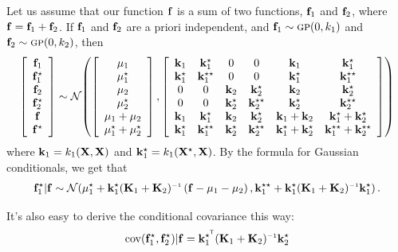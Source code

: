 \documentclass[twoside]{article}
\theoremstyle{definition}
\theoremstyle{remark}
\numberwithin{equation}{section}
\numberwithin{thm}{section}
\begin{document}
Let us assume that our function ${\bf{f}}$ is a sum of two functions, ${\bf{f}}_1$ and ${\bf{f}}_2$, where ${\bf{f}} = {\bf{f}}_1 + {\bf{f}}_2$.  If ${\bf{f}}_1$ and ${\bf{f}}_2$ are a priori independent, and ${\bf{f}}_1 \sim {\textsc{gp}}( 0, k_1)$ and ${\bf{f}}_2 \sim {\textsc{gp}}( 0, k_2)$, then
\begin{align*}
\left[ \begin{array}{c} {\bf{f}}_1 \\ {\bf{f}}_1^\star \\ {\bf{f}}_2 \\ {\bf{f}}_2^\star \\ {\bf{f}} \\ {\bf{f}}^\star \end{array} \right]
\sim
\mathcal{N}\!\left(\left[ \begin{array}{c} {\bf{\mu}}_1 \\ {\bf{\mu}}_1^\star \\ {\bf{\mu}}_2 \\ {\bf{\mu}}_2^\star \\ {\bf{\mu}}_1 + {\bf{\mu}}_2 \\ {\bf{\mu}}_1^\star + {\bf{\mu}}_2^\star \end{array} \right]
,\left[ \begin{array}{cccccc} 
{\bf{k}}_1 & {\bf{k}}_1^\star & 0 & 0 & {\bf{k}}_1 & {\bf{k}}_1^\star \\ 
{\bf{k}}_1^\star & {\bf{k}}_1^{\star\star} & 0 & 0 & {\bf{k}}_1^\star & {\bf{k}}_1^{\star\star} \\
0 & 0 & {\bf{k}}_2 & {\bf{k}}_2^\star & {\bf{k}}_2 & {\bf{k}}_2^\star \\ 
0 & 0 & {\bf{k}}_2^\star & {\bf{k}}_2^{\star\star} & {\bf{k}}_2^\star & {\bf{k}}_2^{\star\star} \\
{\bf{k}}_1 & {\bf{k}}_1^\star & {\bf{k}}_2 & {\bf{k}}_2^\star & {\bf{k}}_1 + {\bf{k}}_2 & {\bf{k}}_1^\star + {\bf{k}}_2^\star \\ 
{\bf{k}}_1^\star & {\bf{k}}_1^{\star\star}  & {\bf{k}}_2^\star & {\bf{k}}_2^{\star\star}  & {\bf{k}}_1^\star + {\bf{k}}_2^\star & {\bf{k}}_1^{\star\star} + {\bf{k}}_2^{\star\star}\\
\end{array} \right]
\right)
\end{align*}
where ${\bf{k}}_1 = k_1( \mathbf{X}, \mathbf{X} )$ and ${\bf{k}}_1^\star = k_1( \mathbf{X}^\star, \mathbf{X} )$. By the formula for Gaussian conditionals, we get that
\begin{align*}
\vf_1^\star | \vf \sim \Nt{\vmu_1^\star + \vk_1^\star (\vK_1 + \vK_2)\inv \left( \vf - \vmu_1 - \vmu_2 \right) }
{\vk_1^{\star\star} + \vk_1^\star (\vK_1 + \vK_2)\inv \vk_1^\star }.
\end{align*}

It's also easy to derive the conditional covariance this way:
\begin{align*}
\cov(\vf_1^\star, \vf_2^\star) | \vf = \vk_1^{\star\tra} (\vK_1 + \vK_2)\inv \vk_2^\star
\end{align*}
\end{document}
